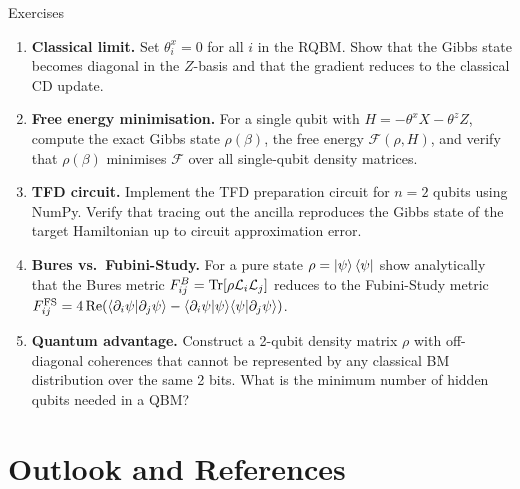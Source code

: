 \documentclass[aspectratio=169,10pt]{beamer}
\begin{document}
\begin{frame}{Exercises}
  \begin{enumerate}\itemsep6pt
    \item \textbf{Classical limit.} Set $\theta_i^x = 0$ for all $i$
          in the RQBM. Show that the Gibbs state becomes diagonal in
          the $Z$-basis and that the gradient reduces to the classical
          CD update.

    \item \textbf{Free energy minimisation.} For a single qubit with
          $H = -\theta^x X - \theta^z Z$, compute the exact Gibbs state
          $\rho(\beta)$, the free energy $\mathcal{F}(\rho,H)$, and verify
          that $\rho(\beta)$ minimises $\mathcal{F}$ over all single-qubit
          density matrices.

    \item \textbf{TFD circuit.} Implement the TFD preparation circuit
          for $n=2$ qubits using NumPy. Verify that tracing out the
          ancilla reproduces the Gibbs state of the target Hamiltonian
          up to circuit approximation error.

    \item \textbf{Bures vs.\ Fubini-Study.} For a pure state
          $\rho = \ket{\psi}\bra{\psi}$ show analytically that the
          Bures metric $F^B_{ij} = \Tr[\rho\mathcal{L}_i\mathcal{L}_j]$
          reduces to the Fubini-Study metric $F^{\rm FS}_{ij} =
          4\,\mathrm{Re}(\langle\partial_i\psi|\partial_j\psi\rangle -
          \langle\partial_i\psi|\psi\rangle\langle\psi|\partial_j\psi\rangle)$.

    \item \textbf{Quantum advantage.} Construct a 2-qubit density matrix
          $\rho$ with off-diagonal coherences that cannot be represented
          by any classical BM distribution over the same 2 bits.
          What is the minimum number of hidden qubits needed in a QBM?
  \end{enumerate}
\end{frame}

\section{Outlook and References}
\end{document}
